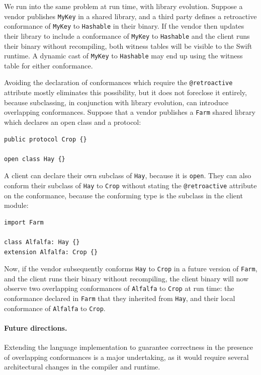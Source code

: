 \documentclass[../generics]{subfiles}
\begin{document}
We run into the same problem at run time, with library evolution. Suppose a vendor publishes \texttt{MyKey} in a shared library, and a third party defines a retroactive conformance of \texttt{MyKey} to \texttt{Hashable} in their binary. If the vendor then updates their library to include a conformance of \texttt{MyKey} to \texttt{Hashable} and the client runs their binary without recompiling, both witness tables will be visible to the Swift runtime. A dynamic cast of \texttt{MyKey} to \texttt{Hashable} may end up using the witness table for either conformance.

Avoiding the declaration of conformances which require the \verb|@retroactive| attribute mostly eliminates this possibility, but it does not foreclose it entirely, because subclassing, in conjunction with library evolution, can introduce overlapping conformances. Suppose that a vendor publishes a \texttt{Farm} shared library which declares an open class and a protocol:
\begin{Verbatim}
public protocol Crop {}

open class Hay {}
\end{Verbatim}
A client can declare their own subclass of \texttt{Hay}, because it is \texttt{open}. They can also conform their subclass of \texttt{Hay} to \texttt{Crop} without stating the \verb|@retroactive| attribute on the conformance, because the conforming type is the subclass in the client module:
\begin{Verbatim}
import Farm

class Alfalfa: Hay {}
extension Alfalfa: Crop {}
\end{Verbatim}
Now, if the vendor subsequently conforms \texttt{Hay} to \texttt{Crop} in a future version of \texttt{Farm}, and the client runs their binary without recompiling, the client binary will now observe two overlapping conformances of \texttt{Alfalfa} to \texttt{Crop} at run time: the conformance declared in \texttt{Farm} that they inherited from \texttt{Hay}, and their local conformance of \texttt{Alfalfa} to \texttt{Crop}.

\paragraph{Future directions.} Extending the language implementation to guarantee correctness in the presence of overlapping conformances is a major undertaking, as it would require several architectural changes in the compiler and runtime.
\end{document}
